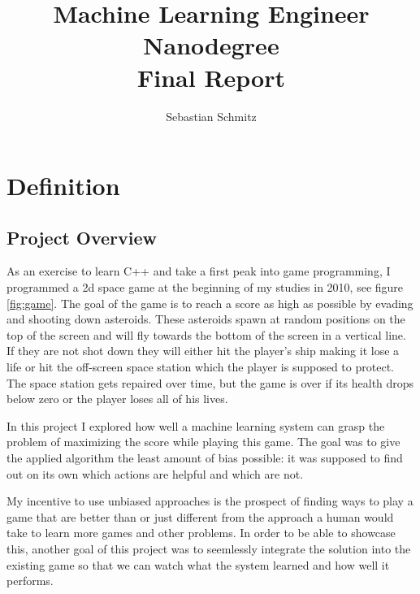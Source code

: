 \documentclass[a4paper,10pt]{article}
\title{Machine Learning Engineer Nanodegree\\Final Report}
\author{Sebastian Schmitz}
\begin{document}
\maketitle
\clearpage
\section{Definition}

\subsection{Project Overview}
As an exercise to learn C++ and take a first peak into game programming, I programmed a 2d space game at the beginning of my studies in 2010, see figure \ref{fig:game}.
The goal of the game is to reach a score as high as possible by evading and shooting down asteroids.
These asteroids spawn at random positions on the top of the screen and will fly towards the bottom of the screen in a vertical line.
If they are not shot down they will either hit the player's ship making it lose a life or hit the off-screen space station which the player is supposed to protect.
The space station gets repaired over time, but the game is over if its health drops below zero or the player loses all of his lives.

In this project I explored how well a machine learning system can grasp the problem of maximizing the score while playing this game.
The goal was to give the applied algorithm the least amount of bias possible: it was supposed to find out on its own which actions are helpful and which are not.

My incentive to use unbiased approaches is the prospect of finding ways to play a game that are better than or just different from the approach a human would take to learn more games and other problems.
In order to be able to showcase this, another goal of this project was to seemlessly integrate the solution into the existing game so that we can watch what the system learned and how well it performs.

\end{document}
